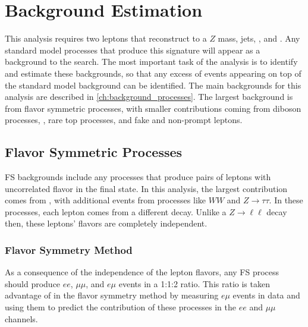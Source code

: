 
\chapter{Background Estimation} %
\label{ch:backgrounds} 

This analysis requires two leptons that reconstruct to a $Z$ mass, jets, \met, and \HT. Any standard model processes that produce this signature will appear as a background to the search. The most important task of the analysis is to identify and estimate these backgrounds, so that any excess of events appearing on top of the standard model background can be identified. The main backgrounds for this analysis are described in \autoref{ch:background_processes}. The largest background is from flavor symmetric processes, with smaller contributions coming from diboson processes, \dyjets, rare top processes, and fake and non-prompt leptons.


\section{Flavor Symmetric Processes}
\label{sec:bg-fs}

\acf{FS} backgrounds include any processes that produce pairs of leptons with uncorrelated flavor in the final state. In this analysis, the largest contribution comes from \ttbar, with additional events from processes like $WW$ and $Z\rightarrow\tau\tau$. In these processes, each lepton comes from a different decay. Unlike a $Z\rightarrow \ell\ell$ decay then, these leptons' flavors are completely independent. 

\subsection{Flavor Symmetry Method}
\label{sec:method-fs}
As a consequence of the independence of the lepton flavors, any \ac{FS} process should produce $ee$, $\mu\mu$, and $e\mu$ events in a 1:1:2 ratio. This ratio is taken advantage of in the flavor symmetry method by measuring $e\mu$ events in data and using them to predict the contribution of these processes in the $ee$ and $\mu\mu$ channels. \cite{SUSY-2014-10}


